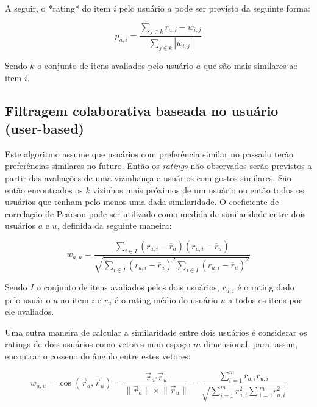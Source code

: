 \documentclass[12pt,a4paper,header]{abnt}
\begin{document}
A seguir, o *rating* do item $i$ pelo usuário $a$ pode ser previsto da seguinte forma\cite{melville2011recommender}:

\begin{equation}
p_{a, i} = \frac{\sum_{j \in k}{r_{a, i} - w_{i, j}}}{\sum_{j \in k}{\left|w_{i, j}\right|}}
\end{equation}

Sendo $k$ o conjunto de itens avaliados pelo usuário $a$ que são mais similares ao item $i$.

\subsection{Filtragem colaborativa baseada no usuário (user-based)}

Este algoritmo assume que usuários com preferência similar no passado terão preferências similares no futuro. Então os \textit{ratings} não observados serão previstos a partir das avaliações de uma vizinhança e usuários com gostos similares\cite{hahsler2015recommenderlab}. São então encontrados os $k$ vizinhos mais próximos de um usuário ou então todos os usuários que tenham pelo menos uma dada similaridade. O coeficiente de correlação de Pearson pode ser utilizado como medida de similaridade entre dois usuários $a$ e $u$, definida da seguinte maneira\cite{melville2011recommender}:

\begin{equation}
w_{a, u} = \frac{\sum_{i \in I}{(r_{a, i} - \overline{r}_a ) ( r_{u, i} - \overline{r}_u )}}{\sqrt{\sum_{i \in I}{(r_{a, i} - \overline{r}_a )^2} \sum_{i \in I}{(r_{u, i} - \overline{r}_u )^2}}}
\end{equation}

Sendo $I$ o conjunto de itens avaliados pelos dois usuários, $r_{u, i}$ é o rating dado pelo usuário $u$ ao item $i$ e $\overline{r}_u$ é o rating médio do usuário $u$ a todos os itens por ele avaliados. 

Uma outra maneira de calcular a similaridade entre dois usuários é considerar os ratings de dois usuários como vetores num espaço $m$-dimensional, para, assim, encontrar o cosseno do ângulo entre estes vetores\cite{melville2011recommender}:

\begin{equation}
w_{a, u} = \cos({\vec{r}_a, \vec{r}_u}) = \frac{\vec{r}_a \boldsymbol{\cdot} \vec{r}_u}{\lVert \vec{r}_a\rVert \times \lVert \vec{r}_u\rVert} = \frac{\sum_{i=1}^{m}{r_{a, i} r_{u, i}}}{\sqrt{\sum_{i=1}^{m}{r^2_{a, i}} \sum{_{i=1}^{m}{r^2_{u, i}}}}}
\end{equation}
\end{document}
